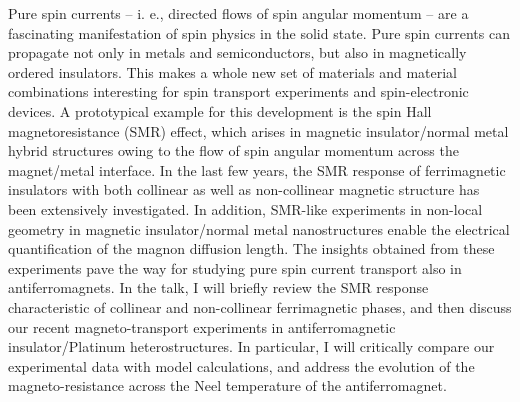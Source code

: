 Pure spin currents -- i. e., directed flows of spin angular momentum -- are a fascinating manifestation of spin physics in the solid state. Pure spin currents can propagate not only in metals and semiconductors, but also in magnetically ordered insulators. This makes a whole new set of materials and material combinations interesting for spin transport experiments and spin-electronic devices. 
A prototypical example for this development is the spin Hall magnetoresistance (SMR) effect, which arises in magnetic insulator/normal metal hybrid structures owing to the flow of spin angular momentum across the magnet/metal interface. In the last few years, the SMR response of ferrimagnetic insulators with both collinear as well as non-collinear magnetic structure has been extensively investigated. In addition, SMR-like experiments in non-local geometry in magnetic insulator/normal metal nanostructures enable the electrical quantification of the magnon diffusion length. The insights obtained from these experiments pave the way for studying pure spin current transport also in antiferromagnets. In the talk, I will briefly review the SMR response characteristic of collinear and non-collinear ferrimagnetic phases, and then discuss our recent magneto-transport experiments in antiferromagnetic insulator/Platinum heterostructures. In particular, I will critically compare our experimental data with model calculations, and address the evolution of the magneto-resistance across the Neel temperature of the antiferromagnet.